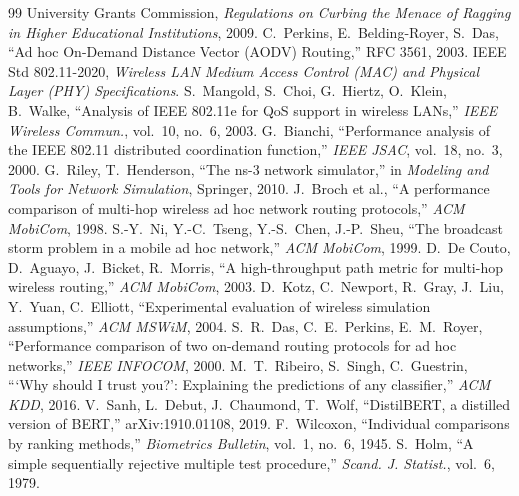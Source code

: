 \begin{thebibliography}{99}
 University Grants Commission, \emph{Regulations on Curbing the Menace of Ragging in Higher Educational Institutions}, 2009.
 C.~Perkins, E.~Belding-Royer, S.~Das, ``Ad hoc On-Demand Distance Vector (AODV) Routing,'' RFC 3561, 2003.
 IEEE Std 802.11-2020, \emph{Wireless LAN Medium Access Control (MAC) and Physical Layer (PHY) Specifications}.
 S.~Mangold, S.~Choi, G.~Hiertz, O.~Klein, B.~Walke, ``Analysis of IEEE 802.11e for QoS support in wireless LANs,'' \emph{IEEE Wireless Commun.}, vol.~10, no.~6, 2003.
 G.~Bianchi, ``Performance analysis of the IEEE 802.11 distributed coordination function,'' \emph{IEEE JSAC}, vol.~18, no.~3, 2000.
 G.~Riley, T.~Henderson, ``The ns-3 network simulator,'' in \emph{Modeling and Tools for Network Simulation}, Springer, 2010.
 J.~Broch et al., ``A performance comparison of multi-hop wireless ad hoc network routing protocols,'' \emph{ACM MobiCom}, 1998.
 S.-Y.~Ni, Y.-C.~Tseng, Y.-S.~Chen, J.-P.~Sheu, ``The broadcast storm problem in a mobile ad hoc network,'' \emph{ACM MobiCom}, 1999.
 D.~De Couto, D.~Aguayo, J.~Bicket, R.~Morris, ``A high-throughput path metric for multi-hop wireless routing,'' \emph{ACM MobiCom}, 2003.
 D.~Kotz, C.~Newport, R.~Gray, J.~Liu, Y.~Yuan, C.~Elliott, ``Experimental evaluation of wireless simulation assumptions,'' \emph{ACM MSWiM}, 2004.
 S.~R.~Das, C.~E.~Perkins, E.~M.~Royer, ``Performance comparison of two on-demand routing protocols for ad hoc networks,'' \emph{IEEE INFOCOM}, 2000.
 M.~T.~Ribeiro, S.~Singh, C.~Guestrin, ```Why should I trust you?': Explaining the predictions of any classifier,'' \emph{ACM KDD}, 2016.
 V.~Sanh, L.~Debut, J.~Chaumond, T.~Wolf, ``DistilBERT, a distilled version of BERT,'' arXiv:1910.01108, 2019.
 F.~Wilcoxon, ``Individual comparisons by ranking methods,'' \emph{Biometrics Bulletin}, vol.~1, no.~6, 1945.
 S.~Holm, ``A simple sequentially rejective multiple test procedure,'' \emph{Scand. J. Statist.}, vol.~6, 1979.
\end{thebibliography}
